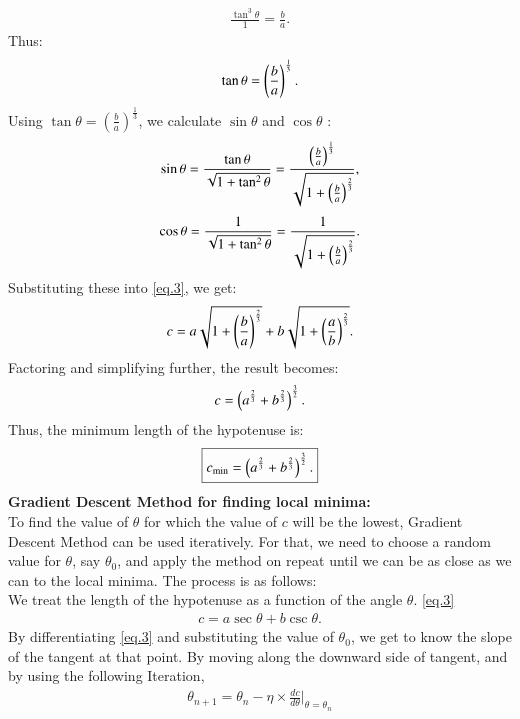 \documentclass[journal,12pt,onecolumn]{IEEEtran}
\theoremstyle{remark}
\begin{document}
\begin{align}
\frac{\tan^3\theta}{1} = \frac{b}{a}.
\end{align}
Thus:
\begin{align}
\tan\theta = \left( \frac{b}{a} \right)^{\frac{1}{3}}. 
\end{align}
Using $\tan\theta = \left( \frac{b}{a} \right)^{\frac{1}{3}}$, we calculate $\sin\theta$ and $\cos\theta$ :
\begin{align}
\sin\theta = \frac{\tan\theta}{\sqrt{1 + \tan^2\theta}} = \frac{\left(\frac{b}{a} \right)^{\frac{1}{3}}}{\sqrt{1 + \left( \frac{b}{a} \right)^{\frac{2}{3}}}},
\end{align}
\begin{align}
\cos\theta = \frac{1}{\sqrt{1 + \tan^2\theta}} = \frac{1}{\sqrt{1 + \left( \frac{b}{a} \right)^{\frac{2}{3}}}}.
\end{align}
Substituting these into \ref{eq.3}, we get:
\begin{align}
c = a \sqrt{1 + \left( \frac{b}{a} \right)^{\frac{2}{3}}} + b \sqrt{1 + \left( \frac{a}{b} \right)^{\frac{2}{3}}}.
\end{align}
Factoring and simplifying further, the result becomes:
\begin{align}
c = \left( a^{\frac{2}{3}} + b^{\frac{2}{3}} \right)^{\frac{3}{2}}.
\end{align}
Thus, the minimum length of the hypotenuse is:
\begin{align}
\boxed{c_{\text{min}} = \left( a^{\frac{2}{3}} + b^{\frac{2}{3}} \right)^{\frac{3}{2}}.}
\end{align}
\textbf{Gradient Descent Method for finding local minima:}\\ 
To find the value of $\theta$ for which the value of $c$ will be the lowest, Gradient Descent Method can be used iteratively. For that, we need to choose a random value for $\theta$, say $\theta_0$, and apply the method on repeat until we can be as close as we can to the local minima. The process is as follows:\\
We treat the length of the hypotenuse as a function of the angle $\theta$. \ref{eq.3}
\begin{align}
    c = a \sec\theta + b \csc\theta.
\end{align}
 By differentiating \ref{eq.3} and substituting the value of $\theta_0$, we get to know the slope of the tangent at that point. By moving along the downward side of tangent, and by using the following Iteration,
 \begin{align}
  \theta_{n+1} = \theta_n - \eta \times \frac{dc}{d\theta} \bigg|_{\theta = \theta_n}   
 \end{align}
\end{document}
